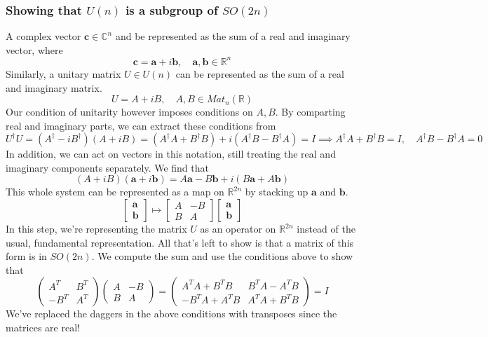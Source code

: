 \subsubsection*{Showing that $U(n)$ is a subgroup of $SO(2n)$} 
A complex vector $\mathbf{c} \in \mathbb{C}^n$ and be represented as the sum of a real and imaginary vector, where 
\[ 
\mathbf{c} = \mathbf{a} + i \mathbf{b}, \quad \mathbf{a}, \mathbf{b} \in \mathbb{R}^n 
\] 
Similarly, a unitary matrix $U \in U ( n) $ can be represented as the sum of a real and imaginary matrix. 
\[ 
U  = A + i B, \quad A, B \in Mat_n (\mathbb{R} ) 
\] 
Our condition of unitarity however imposes conditions on $A, B$. By comparting real and imaginary parts, we can extract these conditions from 
\[ 
U^\dagger U = (A^\dagger - i B^\dagger)( A + iB ) = (A^\dagger A  + B^\dagger B ) + i ( A^\dagger B - B^\dagger A ) = I \implies A^\dagger A + B^\dagger B = I, \quad A^\dagger B - B^\dagger A  = 0 
\] 
In addition, we can act on vectors in this notation, still treating the real and imaginary components separately. We find that 
\[ 
( A + iB)( \mathbf{a} + i \mathbf{b}) =  A\mathbf{a} - B\mathbf{b} + i (B \mathbf{a}  + A \mathbf{b} ) 
\] 
This whole system can be represented as a map on $\mathbb{R}^{2n}$ by stacking up $\mathbf{a}$ and $\mathbf{b}$. 
\[ 
\begin{bmatrix} \mathbf{a} \\ \mathbf{b} \end{bmatrix} \mapsto \begin{bmatrix} A & -B \\ B & A \end{bmatrix} \begin{bmatrix} \mathbf{a} \\ \mathbf{b} \end{bmatrix} 
\] 
In this step, we're representing the matrix $U$ as an operator on $\mathbb{R}^{ 2n}$ instead of the usual, fundamental representation. All that's left to show is that a matrix of this form is in $SO ( 2n)$. We compute the sum and use the conditions above to show that 
\[ 
\begin{pmatrix} A^T & B^T \\  - B^T & A^T \end{pmatrix} \begin{pmatrix} A & - B \\ B & A \end{pmatrix}  = \begin{pmatrix} A^T A + B^T B & B^T A - A^T B \\  - B^T  A + A^T B & A^T A + B^T B \end{pmatrix}  = I 
\] 
We've replaced the daggers in the above conditions with transposes since the matrices are real! 


